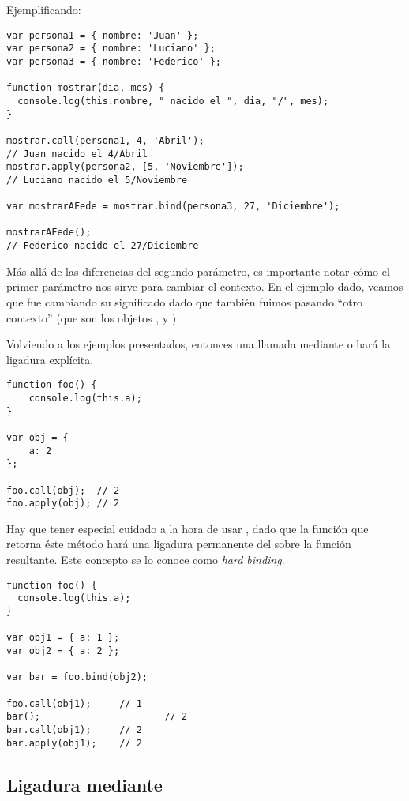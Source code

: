 Ejemplificando:

\begin{lstlisting}[title={\code{call}, \code{apply} y \code{bind} en acción}]
var persona1 = { nombre: 'Juan' };
var persona2 = { nombre: 'Luciano' };
var persona3 = { nombre: 'Federico' };

function mostrar(dia, mes) {
  console.log(this.nombre, " nacido el ", dia, "/", mes);
}

mostrar.call(persona1, 4, 'Abril');
// Juan nacido el 4/Abril
mostrar.apply(persona2, [5, 'Noviembre']);
// Luciano nacido el 5/Noviembre

var mostrarAFede = mostrar.bind(persona3, 27, 'Diciembre');

mostrarAFede();
// Federico nacido el 27/Diciembre
\end{lstlisting}

Más allá de las diferencias del segundo parámetro, es importante notar cómo el primer parámetro nos sirve para cambiar el contexto. En el ejemplo dado, veamos que  fue cambiando su significado dado que también fuimos pasando "`otro contexto"' (que son los objetos ,  y ).

Volviendo a los ejemplos presentados, entonces una llamada mediante  o  hará la ligadura explícita.

\begin{lstlisting}[title={Ligadura explícita}]
function foo() {
	console.log(this.a);
}

var obj = {
	a: 2
};

foo.call(obj); 	// 2
foo.apply(obj);	// 2
\end{lstlisting}

Hay que tener especial cuidado a la hora de usar , dado que la función que retorna éste método hará una ligadura permanente del  sobre la función resultante. Este concepto se lo conoce como \textit{hard binding}.

\begin{lstlisting}[title={\textit{Hard binding} usando \code{bind}}]
function foo() {
  console.log(this.a);
}

var obj1 = { a: 1 };
var obj2 = { a: 2 };

var bar = foo.bind(obj2);

foo.call(obj1);		// 1
bar();						// 2
bar.call(obj1);		// 2
bar.apply(obj1);	// 2
\end{lstlisting}

\subsection{Ligadura mediante }

